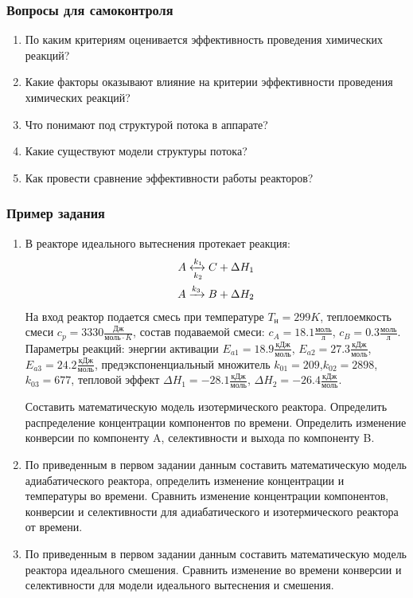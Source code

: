  
 
\subsubsection*{Вопросы для самоконтроля}
\begin{enumerate}
	\item По каким критериям оценивается эффективность проведения химических реакций?
	\item Какие факторы оказывают влияние на критерии эффективности проведения химических реакций?
	\item Что понимают под структурой потока в аппарате?
	\item Какие существуют модели структуры потока?
	\item Как провести сравнение эффективности работы реакторов?
\end{enumerate}

\subsubsection*{Пример задания}
\begin{enumerate}
	\item В реакторе идеального вытеснения протекает реакция: \begin{equation*} \begin{aligned} A \xleftrightarrow[k_2]{k_1} C + \Delta H_1 \\ A \xrightarrow{k_3} B + \Delta H_2 \end{aligned} \end{equation*}                              На вход  реактор подается смесь при температуре $ T_{н} =  299 K$, теплоемкость смеси $c_p= 3330 \frac{Дж}{моль \cdot K}$, состав подаваемой смеси: $c_A=18.1 \frac{моль}{л}$, $c_B=0.3 \frac{моль}{л}$. Параметры реакций: энергии активации $E_{a1}=18.9 \frac{кДж}{моль}$, $E_{a2}=27.3  \frac{кДж}{моль}$, $E_{a3}=24.2  \frac{кДж}{моль}$, предэкспоненциальный множитель $k_{01}=       209$,$k_{02}=      2898$,$k_{03}=       677$, тепловой эффект $\Delta H_1= -28.1  \frac{кДж}{моль}$, $\Delta H_2=-26.4 \frac{кДж}{моль}$.
	
	Составить математическую модель изотермического реактора. Определить распределение концентрации компонентов по времени. Определить изменение конверсии по компоненту A, селективности и выхода по компоненту B. 
	\item  По приведенным в первом задании данным составить математическую модель адиабатического реактора, определить изменение концентрации и температуры во времени. Сравнить изменение концентрации компонентов, конверсии и селективности для адиабатического и изотермического реактора от времени. 
	\item  По приведенным в первом задании данным составить математическую модель реактора идеального смешения. Сравнить изменение во времени конверсии и селективности для модели идеального вытеснения и смешения.
\end{enumerate}